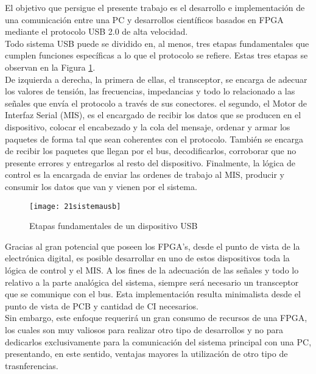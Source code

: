 El objetivo que persigue el presente trabajo es el desarrollo e implementación de una comunicación entre una PC y desarrollos científicos basados en FPGA mediante el protocolo USB 2.0 de alta velocidad.\\

Todo sistema USB puede se dividido en, al menos, tres etapas fundamentales que cumplen funciones específicas a lo que el protocolo se refiere. Estas tres etapas se observan en la Figura \ref{usbDeviceScheme}.\\

De izquierda a derecha, la primera de ellas, el transceptor, se encarga de adecuar los valores de tensión, las frecuencias, impedancias y todo lo relacionado a las señales que envía el protocolo a través de sus conectores. el segundo, el Motor de Interfaz Serial (MIS), es el encargado de recibir los datos que se producen en el dispositivo, colocar el encabezado y la cola del mensaje, ordenar y armar los paquetes de forma tal que sean coherentes con el protocolo. También se encarga de recibir los paquetes que llegan por el bus, decodificarlos, corroborar que no presente errores y entregarlos al resto del dispositivo. Finalmente, la lógica de control es la encargada de enviar las ordenes de trabajo al MIS, producir y consumir los datos que van y vienen por el sistema.\\

\begin{figure}
	\centering
	\texttt{[image: 21sistemausb]}
	\caption{Etapas fundamentales de un dispositivo USB}
	\label{usbDeviceScheme}
\end{figure}

Gracias al gran potencial que poseen los FPGA's, desde el punto de vista de la electrónica digital, es posible desarrollar en uno de estos dispositivos toda la lógica de control y el MIS. A los fines de la adecuación de las señales y todo lo relativo a la parte analógica del sistema, siempre será necesario un transceptor que se comunique con el bus. Esta implementación resulta minimalista desde el punto de vista de PCB y cantidad de CI necesarios.\\

Sin embargo, este enfoque requerirá un gran consumo de recursos de una FPGA, los cuales son muy valiosos para realizar otro tipo de desarrollos y no para dedicarlos exclusivamente para la comunicación del sistema principal con una PC, presentando, en este sentido, ventajas mayores la utilización de otro tipo de trasnferencias.\\

